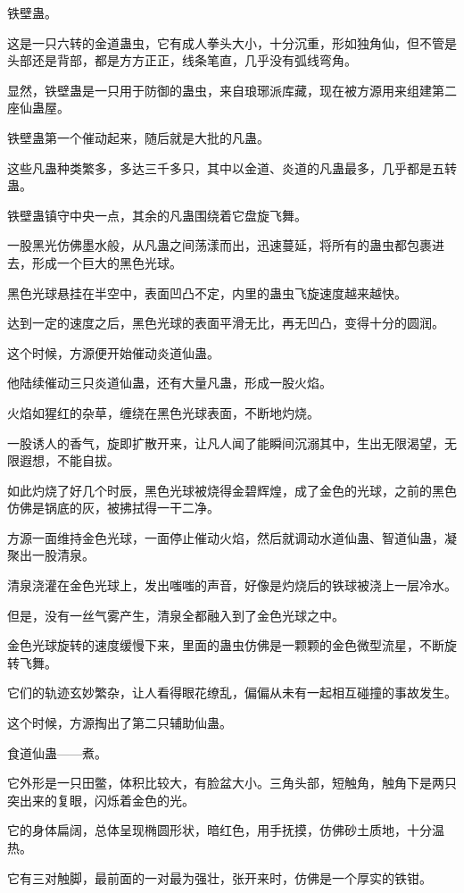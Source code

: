 \begin{this_body}
铁壁蛊。

这是一只六转的金道蛊虫，它有成人拳头大小，十分沉重，形如独角仙，但不管是头部还是背部，都是方方正正，线条笔直，几乎没有弧线弯角。

显然，铁壁蛊是一只用于防御的蛊虫，来自琅琊派库藏，现在被方源用来组建第二座仙蛊屋。

铁壁蛊第一个催动起来，随后就是大批的凡蛊。

这些凡蛊种类繁多，多达三千多只，其中以金道、炎道的凡蛊最多，几乎都是五转蛊。

铁壁蛊镇守中央一点，其余的凡蛊围绕着它盘旋飞舞。

一股黑光仿佛墨水般，从凡蛊之间荡漾而出，迅速蔓延，将所有的蛊虫都包裹进去，形成一个巨大的黑色光球。

黑色光球悬挂在半空中，表面凹凸不定，内里的蛊虫飞旋速度越来越快。

达到一定的速度之后，黑色光球的表面平滑无比，再无凹凸，变得十分的圆润。

这个时候，方源便开始催动炎道仙蛊。

他陆续催动三只炎道仙蛊，还有大量凡蛊，形成一股火焰。

火焰如猩红的杂草，缠绕在黑色光球表面，不断地灼烧。

一股诱人的香气，旋即扩散开来，让凡人闻了能瞬间沉溺其中，生出无限渴望，无限遐想，不能自拔。

如此灼烧了好几个时辰，黑色光球被烧得金碧辉煌，成了金色的光球，之前的黑色仿佛是锅底的灰，被拂拭得一干二净。

方源一面维持金色光球，一面停止催动火焰，然后就调动水道仙蛊、智道仙蛊，凝聚出一股清泉。

清泉浇灌在金色光球上，发出嗤嗤的声音，好像是灼烧后的铁球被浇上一层冷水。

但是，没有一丝气雾产生，清泉全都融入到了金色光球之中。

金色光球旋转的速度缓慢下来，里面的蛊虫仿佛是一颗颗的金色微型流星，不断旋转飞舞。

它们的轨迹玄妙繁杂，让人看得眼花缭乱，偏偏从未有一起相互碰撞的事故发生。

这个时候，方源掏出了第二只辅助仙蛊。

食道仙蛊——煮。

它外形是一只田鳖，体积比较大，有脸盆大小。三角头部，短触角，触角下是两只突出来的复眼，闪烁着金色的光。

它的身体扁阔，总体呈现椭圆形状，暗红色，用手抚摸，仿佛砂土质地，十分温热。

它有三对触脚，最前面的一对最为强壮，张开来时，仿佛是一个厚实的铁钳。


\end{this_body}
